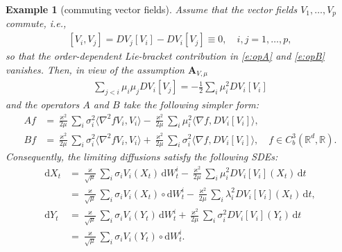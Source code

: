 \documentclass[10pt]{article}
\newcommand{\1}{1\!\!\!\;{\rm I}}
\theoremstyle{plain}
\newtheorem{exa}[thm]{Example}
\theoremstyle{definition}
\newcommand{\ba}{\begin{equation}\begin{aligned}}
\newcommand{\ea}{\end{aligned}\end{equation}}
\newcommand{\di}{\mathrm{d}}
\newcommand{\bR}{\mathbb{R}}
\numberwithin{equation}{section}
\begin{document}
\begin{exa}[commuting vector fields]
Assume that the vector fields $V_1,\dots, V_p$ commute, i.e.,
\ba
{}[V_i,V_j]=DV_j[V_i]-DV_i[V_j]\equiv 0,\quad i,j=1,\dots, p,
\ea
so that the order-dependent Lie-bracket contribution in \eqref{e:opA} and \eqref{e:opB} vanishes.
Then, in view of the assumption $\mathbf{A}_{V,\mu}$
\ba
\sum_{j<i}\mu_i\mu_j DV_i[V_j]=-\frac12 \sum_{i}\mu_i^2 DV_i[V_i]
\ea
and
the operators $A$ and $B$ take the following simpler form:
\ba
Af
&= \frac{\varkappa^2}{2\mu}  \sum_{i} \sigma_{i}^2 \langle \nabla^2 f  V_i, V_i\rangle
- \frac{\varkappa^2}{2\mu} \sum_{i} \mu_i^2 \langle \nabla f , D V_i [ V_i] \rangle,\\
Bf
&=\frac{\varkappa^2}{2\mu} \sum_{i}  \sigma_{i}^2  \langle \nabla^2 f V_i ,V_i\rangle
+ \frac{\varkappa^2}{2\mu} \sum_{i}  \sigma_{i}^2 \langle \nabla f , D V_i [ V_i] \rangle
 ,\quad f\in C^3_b(\bR^d,\bR).
\ea
Consequently, the limiting diffusions satisfy the following SDEs:
\ba
\di X_t&=
\frac{\varkappa}{\sqrt\mu} \sum_{i}  \sigma_{i}  V_i (X_t)\, \di W^i_t
- \frac{\varkappa^2}{2\mu} \sum_{i} \mu_i^2 D V_i [ V_i](X_t)\,\di t\\
&= \frac{\varkappa}{\sqrt\mu} \sum_{i}  \sigma_{i}  V_i (X_t)\circ \di W^i_t
- \frac{\varkappa^2}{2\mu} \sum_{i} \lambda_i^2 D V_i [ V_i](X_t)\,\di t,\\
\di Y_t& = \frac{\varkappa}{\sqrt\mu} \sum_{i}  \sigma_{i}  V_i (Y_t)\, \di W^i_t
+\frac{\varkappa^2}{2\mu} \sum_{i} \sigma_i^2 D V_i [ V_i](Y_t)\,\di t\\
&= \frac{\varkappa}{\sqrt\mu} \sum_{i}  \sigma_{i}  V_i (Y_t)\circ \di W^i_t.
\ea
\end{exa}
\end{document}
